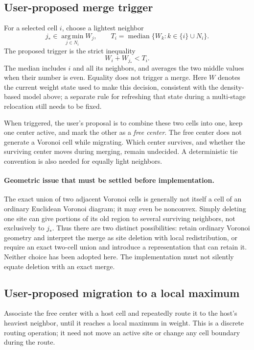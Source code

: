 \subsection{User-proposed merge trigger}
For a selected cell $i$, choose a lightest neighbor
\[
 j_*\in\operatorname*{arg\,min}_{j\in N_i} W_j,\qquad
 T_i=\operatorname{median}\{W_k:k\in\{i\}\cup N_i\}.
\]
The proposed trigger is the strict inequality
\[
 \boxed{W_i+W_{j_*}<T_i.}
\]
The median includes $i$ and all its neighbors, and averages the two middle
values when their number is even. Equality does not trigger a merge. Here $W$
denotes the current weight state used to make this decision, consistent with
the density-based model above; a separate rule for refreshing that state during
a multi-stage relocation still needs to be fixed.

When triggered, the user's proposal is to combine these two cells into one,
keep one center active, and mark the other as a \emph{free center}. The free
center does not generate a Voronoi cell while migrating. Which center survives,
and whether the surviving center moves during merging, remain undecided.
A deterministic tie convention is also needed for equally light neighbors.

\paragraph{Geometric issue that must be settled before implementation.}
The exact union of two adjacent Voronoi cells is generally not itself a cell
of an ordinary Euclidean Voronoi diagram; it may even be nonconvex. Simply
deleting one site can give portions of its old region to several surviving
neighbors, not exclusively to $j_*$. Thus there are two distinct possibilities:
retain ordinary Voronoi geometry and interpret the merge as site deletion with
local redistribution, or require an exact two-cell union and introduce a
representation that can retain it. Neither choice has been adopted here.
The implementation must not silently equate deletion with an exact merge.

\subsection{User-proposed migration to a local maximum}
Associate the free center with a host cell and repeatedly route it to the
host's heaviest neighbor, until it reaches a local maximum in weight. This is
a discrete routing operation; it need not move an active site or change any
cell boundary during the route.


